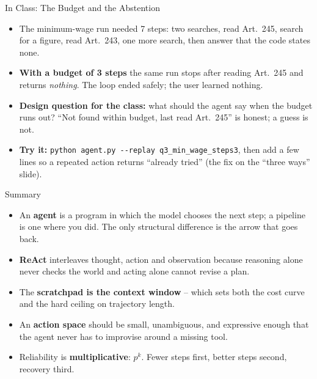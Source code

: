 \begin{frame}{In Class: The Budget and the Abstention}
\begin{itemize}
  \item The minimum-wage run needed 7 steps: two searches, read Art.~245, search for a figure, read Art.~243, one more search, then answer that the code states none.
  \pause
  \item \textbf{With a budget of 3 steps} the same run stops after reading Art.~245 and returns \emph{nothing}. The loop ended safely; the user learned nothing.
  \pause
  \item \textbf{Design question for the class:} what should the agent say when the budget runs out? ``Not found within budget, last read Art.~245'' is honest; a guess is not.
  \pause
  \item \textbf{Try it:} \texttt{python agent.py -{}-replay q3\_min\_wage\_steps3}, then add a few lines so a repeated action returns ``already tried'' (the fix on the ``three ways'' slide).
\end{itemize}
\end{frame}

\begin{frame}{Summary}
\begin{itemize}
  \item An \textbf{agent} is a program in which the model chooses the next step; a pipeline is one where you did. The only structural difference is the arrow that goes back.
  \pause
  \item \textbf{ReAct} interleaves thought, action and observation because reasoning alone never checks the world and acting alone cannot revise a plan.
  \pause
  \item The \textbf{scratchpad is the context window} -- which sets both the cost curve and the hard ceiling on trajectory length.
  \pause
  \item An \textbf{action space} should be small, unambiguous, and expressive enough that the agent never has to improvise around a missing tool.
  \pause
  \item Reliability is \textbf{multiplicative}: $p^{k}$. Fewer steps first, better steps second, recovery third.
\end{itemize}
\end{frame}

